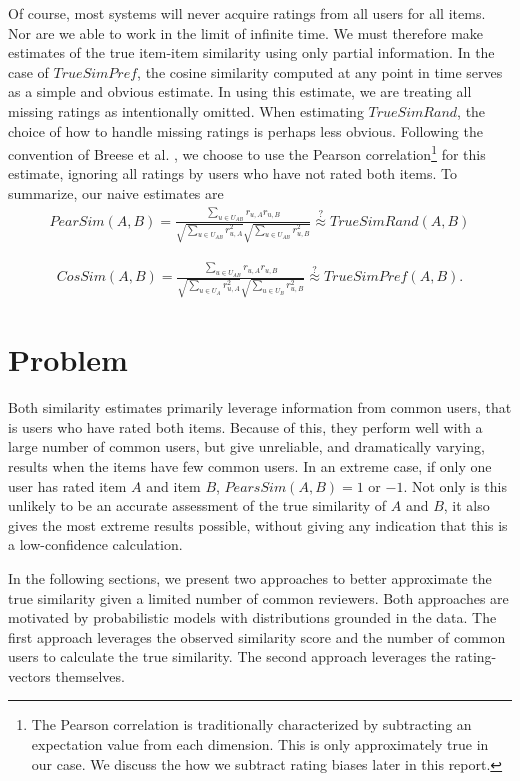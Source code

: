 \documentclass[11pt]{article}
\begin{document}
Of course, most systems will never acquire ratings from all users for all items.
Nor are we able to work in the limit of infinite time. We must therefore make
estimates of the true item-item similarity using only partial information. In
the case of $TrueSimPref$, the cosine similarity computed at any point in time
serves as a simple and obvious estimate. In using this estimate, we are treating
all missing ratings as intentionally omitted. When estimating $TrueSimRand$, the
choice of how to handle missing ratings is perhaps less obvious. Following the
convention of Breese et al. \cite{Breese1998}, we choose to use the Pearson
correlation\footnote{The Pearson correlation is traditionally characterized by
subtracting an expectation value from each dimension. This is only approximately
true in our case. We discuss the how we subtract rating biases later in this
report.} for this estimate, ignoring all ratings by users who have not rated
both items. To summarize, our naive estimates are
\begin{align}
PearSim(A, B) = \frac{\sum\limits_{u\in U_{AB}}
r_{u,A}r_{u,B}}{\sqrt{\sum\limits_{u\in U_{AB}} r_{u,A}^2}
\sqrt{\sum\limits_{u\in U_{AB}} r_{u,B}^2}}
\stackrel{?}{\approx} TrueSimRand(A, B)
\end{align}

\begin{align}
CosSim(A, B) = \frac{\sum\limits_{u\in U_{AB}}
r_{u,A}r_{u,B}}{\sqrt{\sum\limits_{u\in U_A} r_{u,A}^2}
\sqrt{\sum\limits_{u\in U_B} r_{u,B}^2}}
\stackrel{?}{\approx} TrueSimPref(A, B).
\end{align}

\section*{Problem}
Both similarity estimates primarily leverage information from common users, that
is users who have rated both items. Because of this, they perform well with a
large number of common users, but give unreliable, and dramatically varying,
results when the items have few common users. In an extreme case, if only one
user has rated item $A$ and item $B$, $PearsSim(A, B) = 1$ or $-1$. Not only is
this unlikely to be an accurate assessment of the true similarity of $A$ and
$B$, it also gives the most extreme results possible, without giving any
indication that this is a low-confidence calculation.

In the following sections, we present two approaches to better approximate the
true similarity given a limited number of common reviewers. Both approaches are
motivated by probabilistic models with distributions grounded in the data. The
first approach leverages the observed similarity score and the number of common
users to calculate the true similarity. The second approach leverages the
rating-vectors themselves.
\end{document}
